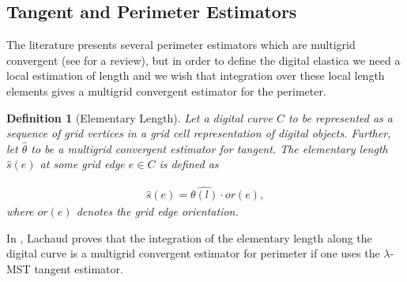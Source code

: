 \documentclass[runningheads]{llncs}
\newtheorem{ddef}{Definition}
\begin{document}
\subsection{Tangent and Perimeter Estimators}

The literature presents several perimeter estimators which are multigrid convergent (see \cite{coeurjolly04,coeurjolly12} for a review), but in order to define the digital elastica we need a local estimation of length and we wish that integration over these local length elements gives a multigrid convergent estimator for the perimeter. 

\begin{ddef}[Elementary Length]
	Let a digital curve $C$ to be represented as a sequence of grid vertices in a grid cell representation of digital objects. Further, let $\hat{\theta}$ to be a multigrid convergent estimator for tangent. The elementary length $\hat{s}(e)$ at some grid edge $e\in C$ is defined as
	
	\begin{align*}
		\hat{s}(e) = \hat{\theta(l)} \cdot or(e),
	\end{align*}
	where $or(e)$ denotes the grid edge orientation.
\end{ddef}

	In \cite{lachaud06}, Lachaud proves that the integration of the elementary length along the digital curve is a multigrid convergent estimator for perimeter if one uses the $\lambda$-MST \cite{lachaud07} tangent estimator.
\end{document}
